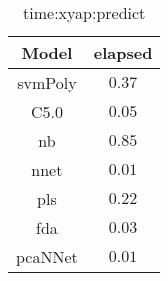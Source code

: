 \begin{table}[!ht]
	\centering
	\begin{tabular}{|c|c|}
		\hline
		Model & elapsed \\ \hline
		svmPoly & $0.37$ \\ \hline
		C5.0 & $0.05$ \\ \hline
		nb & $0.85$ \\ \hline
		nnet & $0.01$ \\ \hline
		pls & $0.22$ \\ \hline
		fda & $0.03$ \\ \hline
		pcaNNet & $0.01$ \\ \hline
	\end{tabular}
	\caption{time:xyap:predict}
	\label{tab:time:xyap:predict}
\end{table}
